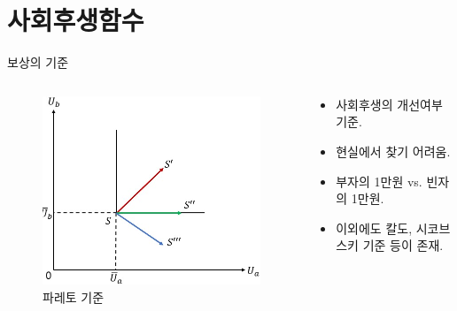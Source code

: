 \documentclass[aspectratio=169,xcolor=dvipsnames,handout]{beamer}
\begin{document}
\section{사회후생함수}
\begin{frame}{보상의 기준}
\begin{columns}
    \begin{column}{.5\textwidth}
        \begin{figure}
            \centering
            \includegraphics[scale=.4]{pic/Pareto.jpg}
            \caption{파레토 기준}
        \end{figure}
    \end{column}    
    \begin{column}{.5\textwidth}
        \begin{itemize}
            \item 사회후생의 개선여부 기준.
            \item 현실에서 찾기 어려움.
            \item 부자의 1만원 vs. 빈자의 1만원.
            \item 이외에도 칼도, 시코브스키 기준 등이 존재.
        \end{itemize}
    \end{column}    
\end{columns}
\end{frame}
\end{document}
